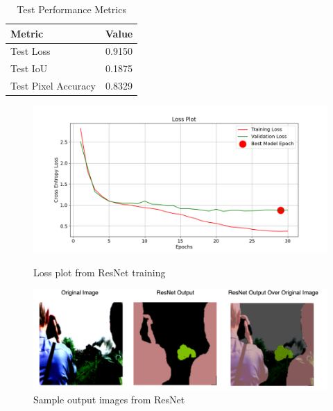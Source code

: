 \documentclass{article}
\begin{document}
\begin{table}[H]
    \centering
    \begin{tabular}{l c}
        \toprule
        \textbf{Metric} & \textbf{Value} \\
        \midrule
        Test Loss & 0.9150 \\
        Test IoU & 0.1875 \\
        Test Pixel Accuracy & 0.8329 \\
        \bottomrule
    \end{tabular}
    \caption{Test Performance Metrics}
    \label{tab:test_metrics}
\end{table}


\begin{figure}[H]
    \centering
    \begin{minipage}{0.5\linewidth}
        \centering
        \includegraphics[width=\linewidth]{resnet_loss.png}
        \caption{Loss plot from ResNet training}
    \end{minipage}%
    \begin{minipage}{0.5\linewidth}
        \centering
        \includegraphics[width=\linewidth]{resnet_pictures.png}
        \caption{Sample output images from ResNet}
    \end{minipage}
\end{figure}



\newpage
\end{document}
